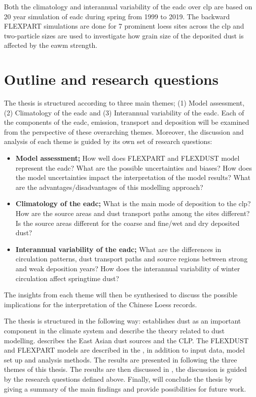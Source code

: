 Both the climatology and interannual variability of the \acrshort{eadc}  over \acrshort{clp} are based on 20 year simulation of \acrshort{eadc} during spring from 1999 to 2019.  
The backward FLEXPART simulations are done for 7 prominent loess sites across the \acrshort{clp} and two-particle sizes are used to investigate how grain size of the deposited dust is affected by the \acrshort{eawm} strength. 

\section{Outline and research questions}
The thesis is structured according to three main themes; (1) Model assessment, (2) Climatology of the \acrshort{eadc} and (3) Interannual variability of the \acrshort{eadc}. Each of the components of the \acrshort{eadc}, emission, transport and deposition will be examined from the perspective of these overarching themes. Moreover, the discussion and analysis of each theme is guided by its own set of research questions: 
\begin{itemize}
    \item \textbf{Model assessment;} How well does FLEXPART and FLEXDUST model represent the \acrshort{eadc}? What are the possible uncertainties and biases? How does the model uncertainties impact the interpretation of the model results? What are the advantages/disadvantages of this modelling approach?
    \item \textbf{Climatology of the \acrshort{eadc};} What is the main mode of deposition to the \acrshort{clp}? How are the source areas and dust transport paths among the sites different? Is the source areas different for the coarse and fine/wet and dry deposited dust? 
    \item \textbf{Interannual variability of the \acrshort{eadc};} What are the differences in circulation patterns, dust transport paths and source regions between strong and weak deposition years? How does the interannual variability of winter circulation affect springtime dust? 
\end{itemize}
The insights from each theme will then be synthesised to discuss the possible implications for the interpretation of the Chinese Loess records. 

The thesis is structured in the following way: 
 establishes dust as an important component in the climate system and describe the theory related to dust modelling. 
 describes the East Asian dust sources and the \acrshort{CLP}. 
The FLEXDUST and FLEXPART models are described in the , in addition to input data, model set up and analysis methods. The results are presented in  following the three themes of this thesis. 
The results are then discussed in , the discussion is guided by the research questions defined above. Finally,  will conclude the thesis by giving a summary of the main findings and provide possibilities for future work. 
